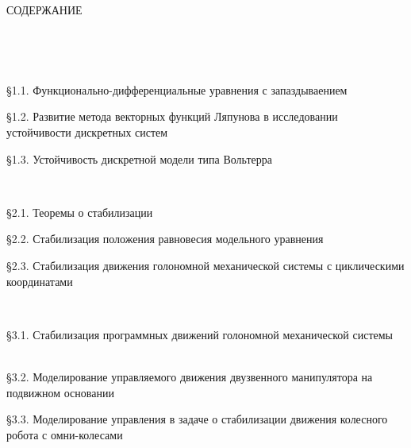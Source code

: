 \documentclass[14pt,a4paper,final,russian]{report}
\renewcommand{\baselinestretch}{1}
\numberwithin{theorem}{chapter}
\numberwithin{lemma}{chapter}
\numberwithin{consectary}{chapter}
\numberwithin{pointout}{chapter}
\numberwithin{definition}{chapter}
\begin{document}
	
	
	\fontsize{14pt}{18pt}\selectfont
	
	\newpage
	\renewcommand{\baselinestretch}{1.5}
	\fontsize{14pt}{18pt}\selectfont
	
	
	{\centerline{ {\sc СОДЕРЖАНИЕ }}
		\vspace{5mm plus 1mm minus .5mm}}
	
	 \dotfill\mbox{\ \ \pageref{prefix}}
	\vglue 0.3cm
	
	 \dotfill\mbox{\ \ \pageref{p11}}
	
	
	\par \vglue 0.3cm 
	\S 1.1. Функционально-дифференциальные уравнения с запаздываением \dotfill\mbox{\ \ \pageref{p11}}
	\par 
	\S 1.2. Развитие метода векторных функций Ляпунова в исследовании устойчивости дискретных систем \dotfill\mbox{\ \ \pageref{p12}}
	
	\S 1.3. Устойчивость дискретной модели типа Вольтерра \dotfill\mbox{\ \ \pageref{p13}}
	
	
	\par \vglue 0.3cm
	 \dotfill\mbox{\ \ \pageref{p21}}
	
	
	\par \vglue 0.3cm
	\S 2.1. Теоремы о стабилизации \dotfill\mbox{\ \ \pageref{p21}}
	
	\S 2.2. Стабилизация положения равновесия модельного уравнения \dotfill\mbox{\ \ \pageref{p22}}
	
	\S 2.3. Стабилизация движения голономной механической системы с циклическими координатами  \dotfill\mbox{\ \ \pageref{p23}}
	
	
	\par \vglue 0.3cm
	 \dotfill\mbox{\ \ \pageref{p31}}
	
	
	\par \vglue 0.3cm
	\S 3.1. Стабилизация программных движений голономной механической системы \dotfill\mbox{\ \ \pageref{p31}}
	
	
	\S 3.2. Моделирование управляемого движения  двузвенного манипулятора на подвижном основании \dotfill\mbox{\ \ \pageref{p32}}
	
	
	\S 3.3. Моделирование управления в задаче о стабилизации движения колесного робота с омни-колесами  \dotfill\mbox{\ \ \pageref{p33}}
	
\end{document}
